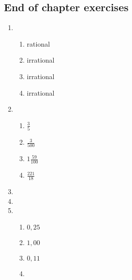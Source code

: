 
\subsection{End of chapter exercises} %

\begin{enumerate}[itemsep=5pt, label=\textbf{\arabic*}. ] 
\item%
    \begin{enumerate}[itemsep=5pt, label=\textbf{(\alph*)} ] 
    \item rational%
    \item irrational%
    \item irrational%
    \item irrational%
    \end{enumerate}
\item %
    \begin{enumerate}[itemsep=5pt, label=\textbf{(\alph*)} ] 
    \item $\frac{3}{5}$%
    \item $\frac{3}{500}$%
    \item $1\frac{59}{100}$%
    \item $\frac{221}{18}$%
    \end{enumerate}
\item %
\item %


\item %
    \begin{enumerate}[itemsep=5pt, label=\textbf{(\alph*)} ]  
    \item $0,25$%
    \item $1,00$%
    \item $0,11$%
    \item%
    \end{enumerate}


\end{enumerate}
